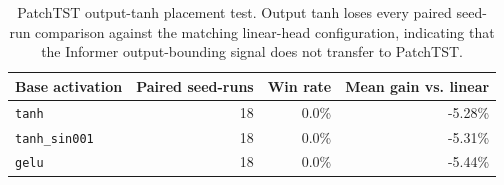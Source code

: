 \begin{table}[t]
\centering
\caption{PatchTST output-tanh placement test. Output tanh loses every paired seed-run comparison against the matching linear-head configuration, indicating that the Informer output-bounding signal does not transfer to PatchTST.}
\label{tab:patchtst_output_tanh}
\begin{tabular}{lrrr}
\toprule
Base activation & Paired seed-runs & Win rate & Mean gain vs. linear \\
\midrule
\texttt{tanh} & 18 & 0.0\% & -5.28\% \\
\texttt{tanh\_sin001} & 18 & 0.0\% & -5.31\% \\
\texttt{gelu} & 18 & 0.0\% & -5.44\% \\
\bottomrule
\end{tabular}
\end{table}
